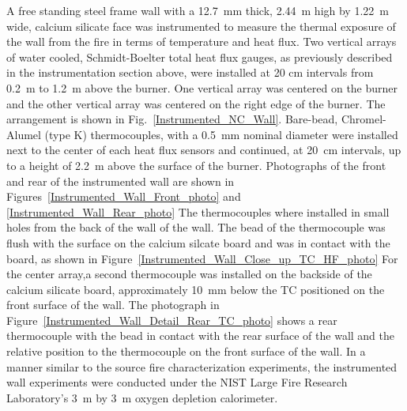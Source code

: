 \documentclass[twoside]{uocthesis}
\begin{document}
{{A free standing steel frame wall with a 12.7~mm thick, 2.44~m high by 1.22~m wide, calcium silicate face was instrumented to measure the thermal exposure of the wall from the fire in terms of temperature and heat flux.  Two vertical arrays of water cooled, Schmidt-Boelter total heat flux gauges, as previously described in the instrumentation section above, were installed at 20 cm intervals from 0.2~m to 1.2~m above the burner.  One vertical array was centered on the burner and the other vertical array was centered on the right edge of the burner. The arrangement is shown in Fig.~\ref{Instrumented_NC_Wall}. Bare-bead, Chromel-Alumel (type K) thermocouples, with a 0.5~mm nominal diameter were installed next to the center of each heat flux sensors and continued, at 20~cm intervals, up to a height of 2.2~m above the surface of the burner. Photographs of the front and rear of the instrumented wall are shown in Figures~\ref{Instrumented_Wall_Front_photo} and \ref{Instrumented_Wall_Rear_photo} The thermocouples where installed in small holes from the back of the wall of the wall.  The bead of the thermocouple was flush with the surface on the calcium silcate board and was in contact with the board, as shown in Figure~\ref{Instrumented_Wall_Close_up_TC_HF_photo} For the center array,a second thermocouple was installed on the backside of the calcium silicate board, approximately 10~mm below the TC positioned on the front surface of the wall. The photograph in Figure~\ref{Instrumented_Wall_Detail_Rear_TC_photo} shows a rear thermocouple with the bead in contact with the rear surface of the wall and the relative position to the thermocouple on the front surface of the wall. In a manner similar to the source fire characterization experiments, the instrumented wall experiments were conducted under the NIST Large Fire Research Laboratory’s 3~m by 3~m oxygen depletion calorimeter.

}}
\end{document}
